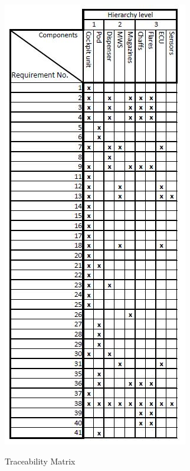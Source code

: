 \begin{figure}[h]
\centering
\includegraphics[scale=0.5]{./images/TraceabilityMatrix}\\
\caption{Traceability Matrix}
\label{fig:traMat}
\end{figure}
